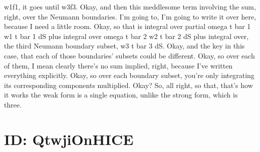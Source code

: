\documentclass[10pt]{article}
\begin{document}
w1f1, it goes until w3f3. Okay, and then this meddlesome term involving the sum, right, over the Neumann boundaries. I'm going to, I'm going to write it over here, because I need a little room. Okay, so that is integral over partial omega t bar 1 w1 t bar 1 dS plus integral over omega t bar 2 w2 t bar 2 dS plus integral over, the third Neumann boundary subset, w3 t bar 3 dS. Okay, and the key in this case, that each of those boundaries' subsets could be different. Okay, so over each of them, I mean clearly there's no sum implied, right, because I've written everything explicitly. Okay, so over each boundary subset, you're only integrating its corresponding components multiplied. Okay? So, all right, so that, that's how it works the weak form is a single equation, unlike the strong form, which is three.

\section*{ID: QtwjiOnHICE}
\end{document}

